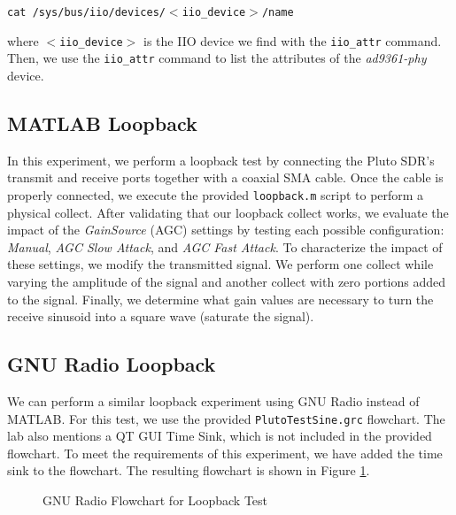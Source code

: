 \documentclass{article}
\begin{document}
\begin{center}
\texttt{cat /sys/bus/iio/devices/$<$iio\_device$>$/name}
\end{center}

where \texttt{$<$iio\_device$>$} is the IIO device we find with the \texttt{iio\_attr} command. Then, we use the \texttt{iio\_attr} command to list the attributes of the \textit{ad9361-phy} device.

\subsection{MATLAB Loopback}

In this experiment, we perform a loopback test by connecting the Pluto SDR's transmit and receive ports together with a coaxial SMA cable. Once the cable is properly connected, we execute the provided \texttt{loopback.m} script to perform a physical collect. After validating that our loopback collect works, we evaluate the impact of the \textit{GainSource} (AGC) settings by testing each possible configuration: \textit{Manual}, \textit{AGC Slow Attack}, and \textit{AGC Fast Attack}. To characterize the impact of these settings, we modify the transmitted signal. We perform one collect while varying the amplitude of the signal and another collect with zero portions added to the signal. Finally, we determine what gain values are necessary to turn the receive sinusoid into a square wave (saturate the signal).

\subsection{GNU Radio Loopback}
\label{section::gnu_radio_loopback}

We can perform a similar loopback experiment using GNU Radio instead of MATLAB. For this test, we use the provided \texttt{PlutoTestSine.grc} flowchart. The lab also mentions a QT GUI Time Sink, which is not included in the provided flowchart. To meet the requirements of this experiment, we have added the time sink to the flowchart. The resulting flowchart is shown in Figure \ref{fig::gnu_radio_loopback_flowchart0}.

\begin{figure}[H]
	\centerline{}
	\caption{GNU Radio Flowchart for Loopback Test}
	\label{fig::gnu_radio_loopback_flowchart0}
\end{figure}
\end{document}
